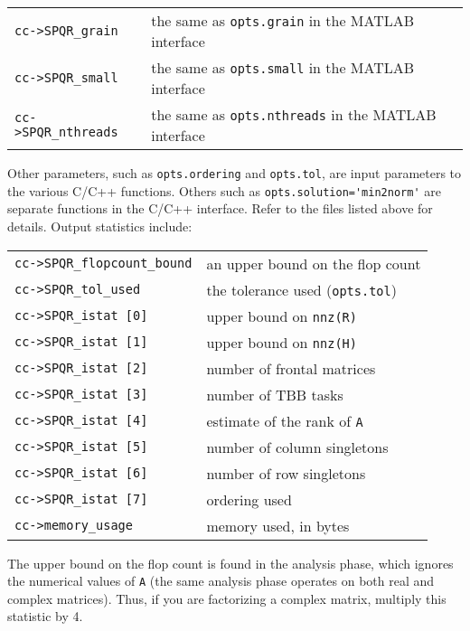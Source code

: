 \documentclass[12pt]{article}
\begin{document}
\vspace{0.1in}
{\footnotesize
\begin{tabular}{|ll|}
\hline
\verb'cc->SPQR_grain' & the same as \verb'opts.grain' in the MATLAB interface \\
\verb'cc->SPQR_small' & the same as \verb'opts.small' in the MATLAB interface \\
\verb'cc->SPQR_nthreads'
    & the same as \verb'opts.nthreads' in the MATLAB interface \\
\hline
\end{tabular}
}
\vspace{0.1in}

Other parameters, such as \verb'opts.ordering' and \verb'opts.tol',
are input parameters to the various C/C++ functions.  Others such as
\verb"opts.solution='min2norm'" are separate functions in the C/C++
interface.  Refer to the files listed above for details.
Output statistics include:

\vspace{0.1in}
{\footnotesize
\begin{tabular}{|ll|}
\hline
\verb'cc->SPQR_flopcount_bound' & an upper bound on the flop count \\
\verb'cc->SPQR_tol_used' & the tolerance used (\verb'opts.tol') \\
\hline
\verb'cc->SPQR_istat [0]' & upper bound on \verb'nnz(R)' \\
\verb'cc->SPQR_istat [1]' & upper bound on \verb'nnz(H)' \\
\verb'cc->SPQR_istat [2]' & number of frontal matrices \\
\verb'cc->SPQR_istat [3]' & number of TBB tasks \\
\verb'cc->SPQR_istat [4]' & estimate of the rank of \verb'A' \\
\verb'cc->SPQR_istat [5]' & number of column singletons \\
\verb'cc->SPQR_istat [6]' & number of row singletons \\
\verb'cc->SPQR_istat [7]' & ordering used \\
\hline
\verb'cc->memory_usage'   & memory used, in bytes \\
\hline
\end{tabular}
}
\vspace{0.1in}

The upper bound on the flop count is found in the analysis phase, which ignores
the numerical values of \verb'A' (the same analysis phase operates on both real
and complex matrices).  Thus, if you are factorizing a complex matrix, multiply
this statistic by 4.
\end{document}
